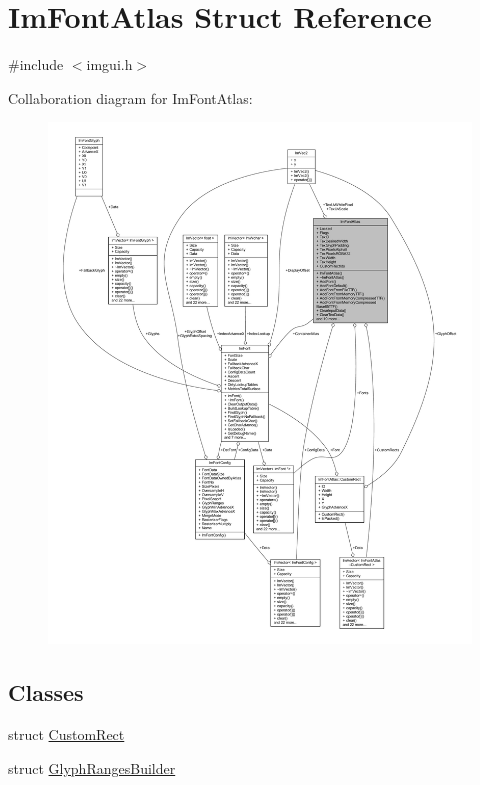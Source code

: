 \hypertarget{struct_im_font_atlas}{}\section{Im\+Font\+Atlas Struct Reference}
\label{struct_im_font_atlas}


{\ttfamily \#include $<$imgui.\+h$>$}



Collaboration diagram for Im\+Font\+Atlas\+:
\nopagebreak
\begin{figure}[H]
\begin{center}
\leavevmode
\includegraphics[width=350pt]{struct_im_font_atlas__coll__graph}
\end{center}
\end{figure}
\subsection*{Classes}
\begin{DoxyCompactItemize}
\item 
struct \mbox{\hyperlink{struct_im_font_atlas_1_1_custom_rect}{Custom\+Rect}}
\item 
struct \mbox{\hyperlink{struct_im_font_atlas_1_1_glyph_ranges_builder}{Glyph\+Ranges\+Builder}}
\end{DoxyCompactItemize}
